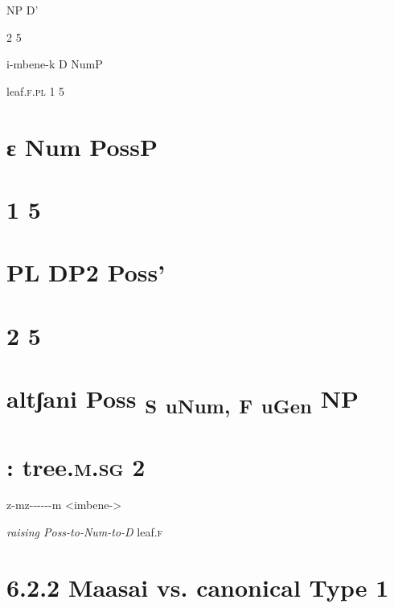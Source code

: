\documentclass[output=paper
,modfonts
,nonflat]{langsci/langscibook}
\begin{document}
NP       D'

2  5

i-mbene-k  D    NumP

leaf.\textsc{f.pl} 1     5

\section{                ɛ       Num              PossP}
\section{                    1       5}
\section{                        PL          DP2             Poss'}
\section{                                2    5}
\section{                              altʃani         Poss \textsubscript{S} \textsubscript{uNum}\textsubscript{,} \textsubscript{F} \textsubscript{uGen}\textsubscript{}   NP}
\section{                :         tree.\textsc{m.sg} 2}

z-mz-{}-{}-{}-{}-{}-m               <imbene->

\textit{raising Poss-to-Num-to-D}                   leaf.\textsc{f}

\section{\textbf{6.2.2    Maasai vs. canonical Type 1}}
\section{\bfseries} 
\end{document}
